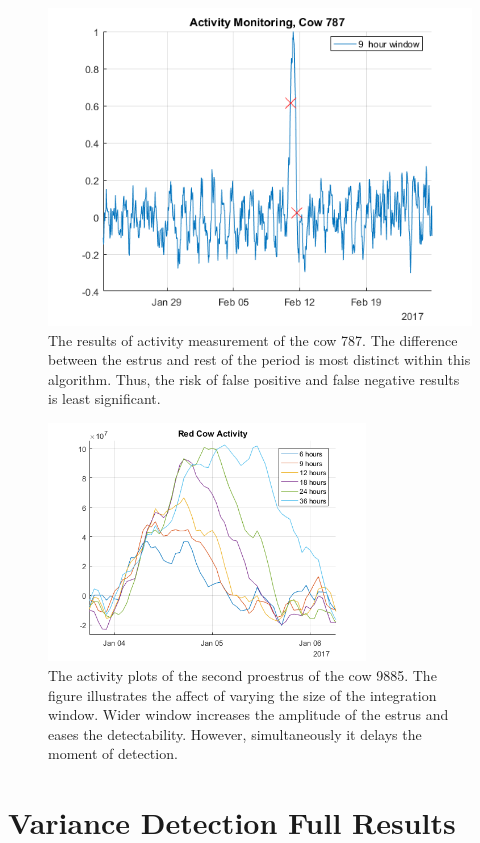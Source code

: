 \begin{figure}[htb]
\centering
\includegraphics[width = 0.75 \textwidth]{figures/ActivityMonitoringCow787.png}
\caption{The results of activity measurement of the cow 787. The difference between the estrus and rest of the period is most distinct within this algorithm. Thus, the risk of false positive and false negative results is least significant.}
\label{ActivityMonitoringCow787}
\end{figure}

\begin{figure}[htb]
\centering
\includegraphics[width = 0.75\textwidth]{figures/redcowactivity2.png}
\caption{The activity plots of the second proestrus of the cow 9885. The figure illustrates the affect of varying the size of the integration window. Wider window increases the amplitude of the estrus and eases the detectability. However, simultaneously it delays the moment of detection. }
\label{integrationwindows}
\end{figure}

\clearpage
\section{Variance Detection Full Results}

